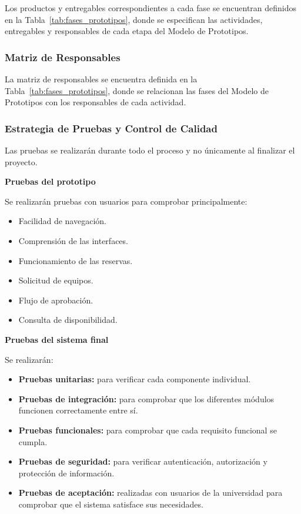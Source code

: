 \documentclass[pdflatex,sn-mathphys-num]{sn-jnl}%
\theoremstyle{thmstyleone}%
\theoremstyle{thmstyletwo}%
\theoremstyle{thmstylethree}%
\begin{document}
 Los productos y entregables correspondientes a cada fase se encuentran definidos en la Tabla~\ref{tab:fases_prototipos}, donde se especifican las actividades, entregables y responsables de cada etapa del Modelo de Prototipos.
 
 \subsubsection{Matriz de Responsables}
 
 La matriz de responsables se encuentra definida en la Tabla~\ref{tab:fases_prototipos}, donde se relacionan las fases del Modelo de Prototipos con los responsables de cada actividad.
 
 
 \subsubsection{Estrategia de Pruebas y Control de Calidad}
 
 Las pruebas se realizarán durante todo el proceso y no únicamente al finalizar el proyecto.
 
 \textbf{Pruebas del prototipo}
 
 Se realizarán pruebas con usuarios para comprobar principalmente:
 
 \begin{itemize}
 	\item Facilidad de navegación.
 	\item Comprensión de las interfaces.
 	\item Funcionamiento de las reservas.
 	\item Solicitud de equipos.
 	\item Flujo de aprobación.
 	\item Consulta de disponibilidad.
 \end{itemize}
 
 \textbf{Pruebas del sistema final}
 
 Se realizarán:
 
 \begin{itemize}
 	\item \textbf{Pruebas unitarias:} para verificar cada componente individual.
 	
 	\item \textbf{Pruebas de integración:} para comprobar que los diferentes módulos funcionen correctamente entre sí.
 	
 	\item \textbf{Pruebas funcionales:} para comprobar que cada requisito funcional se cumpla.
 	
 	\item \textbf{Pruebas de seguridad:} para verificar autenticación, autorización y protección de información.
 	
 	\item \textbf{Pruebas de aceptación:} realizadas con usuarios de la universidad para comprobar que el sistema satisface sus necesidades.
 \end{itemize}
 
\end{document}
